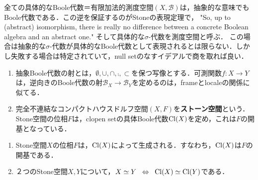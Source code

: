 \documentclass[uplatex, dvipdfmx]{jsreport}
\renewcommand{\B}{\mathcal{B}}
\begin{document}
\begin{discussion}
    全ての具体的なBoole代数＝有限加法的測度空間$(X,\B)$は，抽象的な意味でもBoole代数である．この逆を保証するのがStoneの表現定理で，
    "So, up to (abstract) isomorphism, there is really no difference between a concrete Boolean algebra and an abstract one."\cite{Tao}
    そして具体的な$\sigma$-代数を測度空間と呼ぶ．
    この場合は抽象的な$\sigma$-代数が具体的なBoole代数として表現されるとは限らない．しかし失敗する場合は特定されていて，null setのなすイデアルで商を取れば良い．
\end{discussion}

\begin{definition}\mbox{}
    \begin{enumerate}
        \item 抽象Boole代数の射とは，$\emptyset,\cup,\cap,\comp,\subset$を保つ写像とする．可測関数$f:X\to Y$は，逆向きのBoole代数の射$\B_X\to\B_Y$を定めるのは，frameとlocaleの関係に似てる．
        \item 完全不連結なコンパクトハウスドルフ空間$(X,F)$を\textbf{ストーン空間}という．Stone空間の位相$F$は，clopen setの具体Boole代数$\mathrm{Cl}(X)$を定め，これは$F$の開基となっている．
    \end{enumerate}
\end{definition}

\begin{lemma}\mbox{}
    \begin{enumerate}
        \item Stone空間$X$の位相$F$は，$\mathrm{Cl}(X)$によって生成される．すなわち，$\mathrm{Cl}(X)$は$F$の開基である．
        \item ２つのStone空間$X,Y$について，$X\simeq Y\;\;\Leftrightarrow\;\;\mathrm{Cl}(X)\simeq\mathrm{Cl}(Y)$である．
    \end{enumerate}
\end{lemma}
\end{document}
